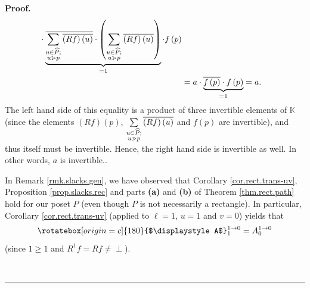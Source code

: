 \documentclass[numbers=enddot,12pt,final,onecolumn,notitlepage]{scrartcl}%
\theoremstyle{definition}
\newenvironment{verlong}{}{}
\newcommand{\undf}{\operatorname*{\bot}}
\newcommand{\upslack}{\mathchoice{\rotatebox[origin=c]{180}{$\displaystyle A$}}{\rotatebox[origin=c]{180}{$\textstyle A$}}{\rotatebox[origin=c]{180}{$\scriptstyle A$}}{\rotatebox[origin=c]{180}{$\scriptscriptstyle A$}}}
\newcommand{\downslack}{A}
\newenvironment{proof}[1][Proof]{\noindent\textbf{#1.} }{\ \rule{0.5em}{0.5em}}
\let\sumnonlimits\sum
\renewcommand{\sum}{\sumnonlimits\limits}
\begin{document}
\begin{verlong}
\begin{proof}
{\begin{align*}
{}\cdot\underbrace{\overline{\sum\limits_{\substack{u\in\widehat{P};\\u\gtrdot
p}}\overline{\left(  Rf\right)  \left(  u\right)  }}\cdot\left(
\sum\limits_{\substack{u\in\widehat{P};\\u\gtrdot p}}\overline{\left(
Rf\right)  \left(  u\right)  }\right)  }_{=1}\cdot f\left(  p\right) \\
&  =a\cdot\underbrace{\overline{f\left(  p\right)  }\cdot f\left(  p\right)
}_{=1} =a.
\end{align*}
The left hand side of this equality is a product of three invertible elements
of $\mathbb{K}$ (since the elements $\left(  Rf\right)  \left(  p\right)  $,
$\sum\limits_{\substack{u\in\widehat{P};\\u\gtrdot p}}\overline{\left(
Rf\right)  \left(  u\right)  }$ and $f\left(  p\right)  $ are invertible), and
thus itself must be invertible. Hence, the right hand side is invertible as
well. In other words, $a$ is invertible.}.

In Remark \ref{rmk.slacks.gen}, we have observed that Corollary
\ref{cor.rect.trans-uv}, Proposition \ref{prop.slacks.rec} and parts
\textbf{(a)} and \textbf{(b)} of Theorem \ref{thm.rect.path} hold for our
poset $P$ (even though $P$ is not necessarily a rectangle). In particular,
Corollary \ref{cor.rect.trans-uv} (applied to $\ell=1$, $u=1$ and $v=0$)
yields that
\begin{equation}
\upslack_{1}^{1\rightarrow0}=\downslack_{0}^{1\rightarrow0}
\label{pf.prop.R.bottom-top.u=d}%
\end{equation}
(since $1\geq1$ and $R^{1}f=Rf\neq\undf$).


\end{proof}
\end{verlong}
\end{document}
